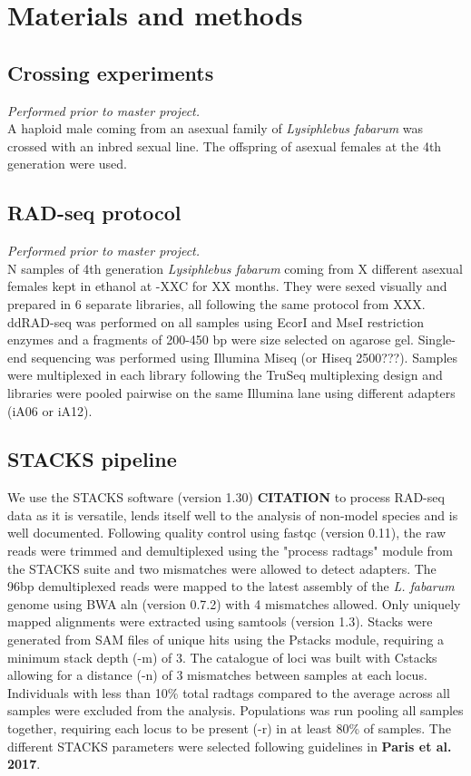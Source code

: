 \documentclass[11pt,a4paper]{report}
\begin{document}
\section*{Materials and methods}

\subsection*{Crossing experiments}
\textit{Performed prior to master project.}\\
A haploid male coming from an asexual family of \textit{Lysiphlebus fabarum} was crossed with an inbred sexual line. The offspring of asexual females at the 4th generation were used.

\subsection*{RAD-seq protocol}
\textit{Performed prior to master project.}\\
N samples of 4th generation \textit{Lysiphlebus fabarum } coming from X different asexual females kept in ethanol at -XX\degree C for XX months. They were sexed visually and prepared in 6 separate libraries, all following the same protocol from XXX. ddRAD-seq was performed on all samples using EcorI and MseI restriction enzymes and a fragments  of 200-450 bp were size selected on agarose gel. Single-end sequencing was performed using Illumina Miseq (or Hiseq 2500???). Samples were multiplexed in each library following the TruSeq multiplexing design and libraries were pooled pairwise on the same Illumina lane using different adapters (iA06 or iA12).

\subsection*{STACKS pipeline}
We use the STACKS software (version 1.30) \textbf{CITATION} to process RAD-seq data as it is versatile, lends itself well to the analysis of non-model species and is well documented.
Following quality control using fastqc (version 0.11), the raw reads were trimmed and demultiplexed using the "process radtags" module from the STACKS suite and two mismatches were allowed to detect adapters. The 96bp demultiplexed reads were mapped to the latest assembly of the \textit{L. fabarum} genome using BWA aln (version 0.7.2) with 4 mismatches allowed. Only uniquely mapped alignments were extracted using samtools (version 1.3). Stacks were generated from SAM files of unique hits using the Pstacks module, requiring a minimum stack depth (-m) of 3. The catalogue of loci was built with Cstacks allowing for a distance (-n) of 3 mismatches between samples at each locus. Individuals with less than 10\% total radtags compared to the average across all samples were excluded from the analysis. Populations was run pooling all samples together, requiring each locus to be present (-r) in at least 80\% of samples. The different STACKS parameters were selected following guidelines in \textbf{Paris et al. 2017}.
\end{document}
